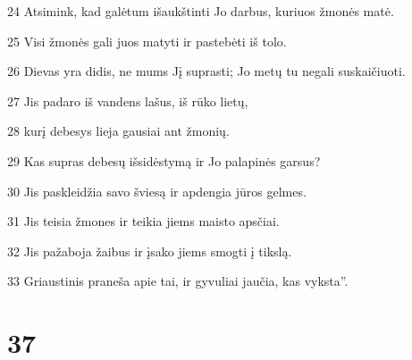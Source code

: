 \par 24 Atsimink, kad galėtum išaukštinti Jo darbus, kuriuos žmonės matė. 
\par 25 Visi žmonės gali juos matyti ir pastebėti iš tolo. 
\par 26 Dievas yra didis, ne mums Jį suprasti; Jo metų tu negali suskaičiuoti. 
\par 27 Jis padaro iš vandens lašus, iš rūko lietų, 
\par 28 kurį debesys lieja gausiai ant žmonių. 
\par 29 Kas supras debesų išsidėstymą ir Jo palapinės garsus? 
\par 30 Jis paskleidžia savo šviesą ir apdengia jūros gelmes. 
\par 31 Jis teisia žmones ir teikia jiems maisto apsčiai. 
\par 32 Jis pažaboja žaibus ir įsako jiems smogti į tikslą. 
\par 33 Griaustinis praneša apie tai, ir gyvuliai jaučia, kas vyksta”.



\chapter{37}


